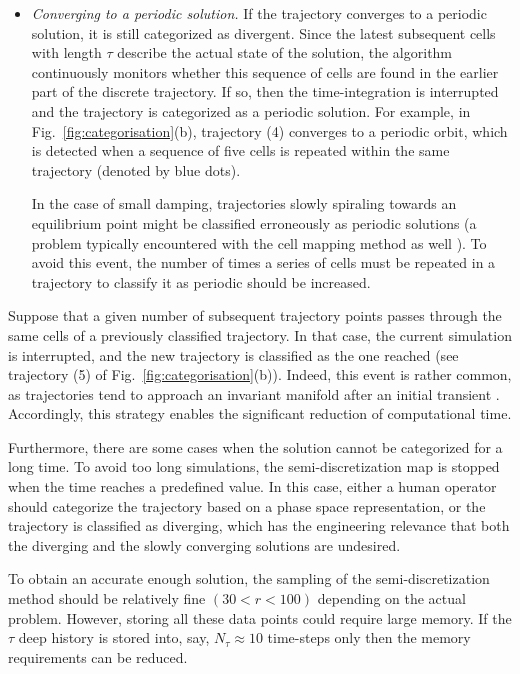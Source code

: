 \documentclass[preprint,12pt]{elsarticle}
\begin{document}
\begin{enumerate}[label=(\alph*)]
\begin{itemize}
			\item \textit{Converging to a periodic solution.} If the trajectory converges to a periodic solution, it is still categorized as divergent. Since the latest subsequent cells with length $\tau$ describe the actual state of the solution, the algorithm continuously monitors whether this sequence of cells are found in the earlier part of the discrete trajectory. If so, then the time-integration is interrupted and the trajectory is categorized as a periodic solution. For example, in Fig.~\ref{fig:categorisation}(b), trajectory (4) converges to a periodic orbit, which is detected when a sequence of five cells is repeated within the same trajectory (denoted by blue dots). 
			
			In the case of small damping, trajectories slowly spiraling towards an equilibrium point might be classified erroneously as periodic solutions (a problem typically encountered with the cell mapping method as well \cite{vio2007bifurcation}). To avoid this event, the number of times a series of cells must be repeated in a trajectory to classify it as periodic should be increased.
		\end{itemize}
	\end{enumerate}
	
	Suppose that a given number of subsequent trajectory points passes through the same cells of a previously classified trajectory. In that case, the current simulation is interrupted, and the new trajectory is classified as the one reached (see trajectory (5) of Fig.~\ref{fig:categorisation}(b)). Indeed, this event is rather common, as trajectories tend to approach an invariant manifold after an initial transient \cite{cirillo2016spectral,cenedese2022data}. Accordingly, this strategy enables the significant reduction of computational time.
	
	Furthermore, there are some cases when the solution cannot be categorized for a long time. To avoid too long simulations, the semi-discretization map is stopped when the time reaches a predefined value. In this case, either a human operator should categorize the trajectory based on a phase space representation, or the trajectory is classified as diverging, which has the engineering relevance that both the diverging and the slowly converging solutions are undesired. 
	
	To obtain an accurate enough solution, the sampling of the semi-dis\-cret\-i\-za\-tion method should be relatively fine $(30 < r <100)$ depending on the actual problem. However, storing all these data points could require large memory. If the $\tau$ deep history is stored into, say, $N_\tau \approx10$ time-steps only then the memory requirements can be reduced. 
	
\end{document}
